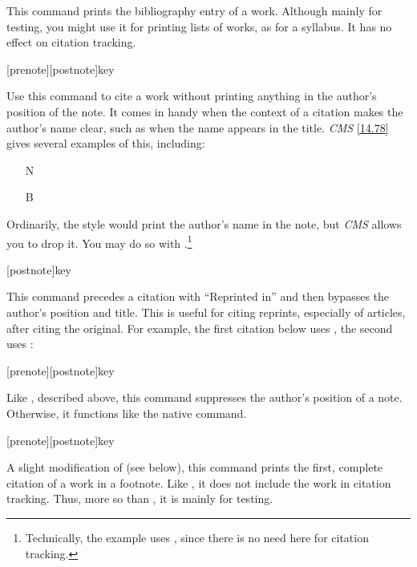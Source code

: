\documentclass[11pt,letterpaper,oneside]{article}
\begin{document}
\begin{ltxsyntax}


This command prints the bibliography entry of a work. Although mainly
for testing, you might use it for printing lists of works, as for a
syllabus. It has no effect on citation tracking.

[prenote][postnote]{key}

Use this command to cite a work without printing anything in the
author's position of the note. It comes in handy when the context of a
citation makes the author's name clear, such as when the name appears
in the title. \textit{CMS} \ref{14.78} gives several examples of this,
including:

\begin{itemize}
\item[N] 

\item[B] 
\end{itemize}

\noindent Ordinarily, the style would print the author's name in the
note, but \textit{CMS} allows you to drop it. You may do so with
.\footnote{Technically, the example uses ,
since there is no need here for citation tracking.}

[postnote]{key}

This command precedes a citation with ``Reprinted in'' and then
bypasses the author's position and title. This is useful for citing
reprints, especially of articles, after citing the original. For
example, the first citation below uses , the second uses
:

\begin{itemize}
\item[] \cite{frankfurt1969} 
\end{itemize}

[prenote][postnote]{key}

Like , described above, this command suppresses the
author's position of a note. Otherwise, it functions like the native
 command.

[prenote][postnote]{key}

A slight modification of  (see below), this command
prints the first, complete citation of a work in a footnote. Like
, it does not include the work in citation tracking.
Thus, more so than , it is mainly for testing.


\end{ltxsyntax}
\end{document}
